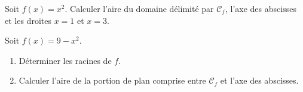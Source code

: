 \documentclass[11pt,a4paper]{article}
\begin{document}
\begin{exo}
Soit $f(x)=x^2$. Calculer l'aire du domaine délimité par $\mathcal{C}_f$, l'axe des abscisses et
les droites $x=1$ et $x=3$.
\end{exo}

\begin{exo}[F5 — bornes par $f(x)=0$, valeur symétrique]
Soit $f(x)=9-x^2$.
\begin{enumerate}[label=\alph*),leftmargin=2em,topsep=2pt]
  \item Déterminer les racines de $f$.
  \item Calculer l'aire de la portion de plan comprise entre $\mathcal{C}_f$ et l'axe des abscisses.
\end{enumerate}
\end{exo}
\end{document}
